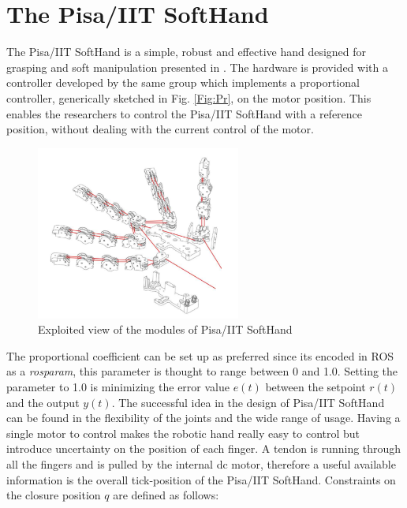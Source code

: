 \section{The Pisa/IIT SoftHand}\label{sec:softhand}
The Pisa/IIT SoftHand is a simple, robust and effective hand designed for grasping and soft manipulation presented in \cite{catalano2014adaptive}. 
The hardware is provided with a controller developed by the same group which implements a proportional controller, generically sketched in Fig. \ref{Fig:Pr}, on the motor position. This enables the researchers to control the Pisa/IIT SoftHand with a reference position, without dealing with the current control of the motor. \\
%
\begin{figure}[h]
\centering
\includegraphics[width=0.6\textwidth]{Figure/softhand.png}
\caption{Exploited view of the modules of Pisa/IIT SoftHand}
\label{Fig:Softhand}
\end{figure}
%
The proportional coefficient can be set up as preferred since its encoded in ROS as a \textit{rosparam}, this parameter is thought to range between 0 and 1.0. Setting the parameter to 1.0 is minimizing the error value $e(t)$  between the setpoint $r(t)$ and the output $y(t)$.
The successful idea in the design of Pisa/IIT SoftHand can be found in the flexibility of the joints and the wide range of usage.
Having a single motor to control makes the robotic hand really easy to control but introduce uncertainty on the position of each finger. 
A tendon is running through all the fingers and is pulled by the internal dc motor, therefore a useful available information is the overall tick-position of the Pisa/IIT SoftHand. Constraints on the closure position $q$ are defined as follows:

